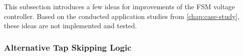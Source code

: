 \label{sec:experimental-modeling}

This subsection introduces a few ideas for improvements of the \acs{FSM} voltage controller.
Based on the conducted application studies from \autoref{chap:case-study}, these ideas are not implemented and tested.

\subsubsection{Alternative Tap Skipping Logic}
\label{sec:modeling-alt-tap-skip}

